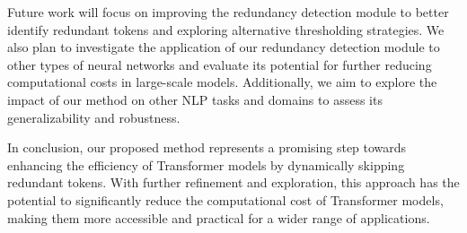 \documentclass{article} %
\begin{document}
Future work will focus on improving the redundancy detection module to better identify redundant tokens and exploring alternative thresholding strategies. We also plan to investigate the application of our redundancy detection module to other types of neural networks and evaluate its potential for further reducing computational costs in large-scale models. Additionally, we aim to explore the impact of our method on other NLP tasks and domains to assess its generalizability and robustness.

In conclusion, our proposed method represents a promising step towards enhancing the efficiency of Transformer models by dynamically skipping redundant tokens. With further refinement and exploration, this approach has the potential to significantly reduce the computational cost of Transformer models, making them more accessible and practical for a wider range of applications.






\end{document}
